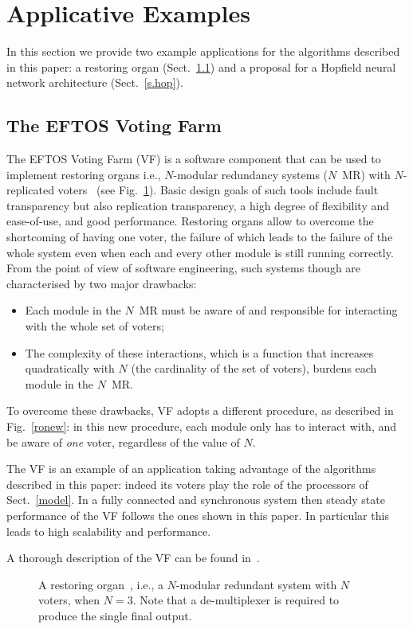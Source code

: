 \documentclass{elsart}
\def\nmr{\hbox{$N$\kern-1pt MR}}
\begin{document}
\section{Applicative Examples}\label{vf}
In this section we provide two example applications for the algorithms described
in this paper: a restoring organ (Sect.~\ref{s.vf}) and a proposal for a Hopfield neural network
architecture (Sect.~\ref{s.hop}).

\subsection{The EFTOS Voting Farm}\label{s.vf}
The EFTOS Voting Farm (VF) is a 
software component that can be used to implement
restoring organs i.e., $N$-modular
redundancy systems (\nmr) with
$N$-replicated voters~\cite{John89a}
(see Fig.~\ref{ro}). Basic design goals of such tools include fault transparency
but also replication transparency,
a high degree of flexibility and ease-of-use, and good performance.
Restoring organs allow to overcome the shortcoming of having
one voter, the failure of which leads to the failure of the whole system
even when each and every other module is still running correctly.
From the point of view of software engineering, such systems
though are characterised by two major drawbacks:
\begin{itemize}
\item Each module in the \nmr{} must be aware of and responsible for
interacting with the whole set of voters;
\item The complexity of these interactions, which is a function that increases
quadratically with $N$ (the cardinality of the set of voters),
burdens each module in the \nmr.
\end{itemize}
To overcome these drawbacks, VF adopts a different procedure, as
described in Fig.~\ref{ronew}: in this new procedure, each module only has
to interact with, and be aware of {\em one\/} voter,
regardless of the value of $N$. 

The VF is an example of an application taking advantage of the algorithms
described in this paper: indeed its voters play the role of the processors 
of Sect.~\ref{model}. In a fully connected and synchronous system
then steady state performance of the VF follows the ones shown in this paper.
In particular this leads to high scalability and performance. 

A thorough description of the VF can be found in~\cite{DeDL98e}.

\begin{figure}
\centerline{}
\caption{A restoring organ~\cite{John89a}, i.e., a $N$\kern-1pt-modular
  redundant system with $N$ voters, when $N=3$. Note that a de-multiplexer
is required to produce the single final output.}
\label{ro}
\end{figure}
\end{document}
